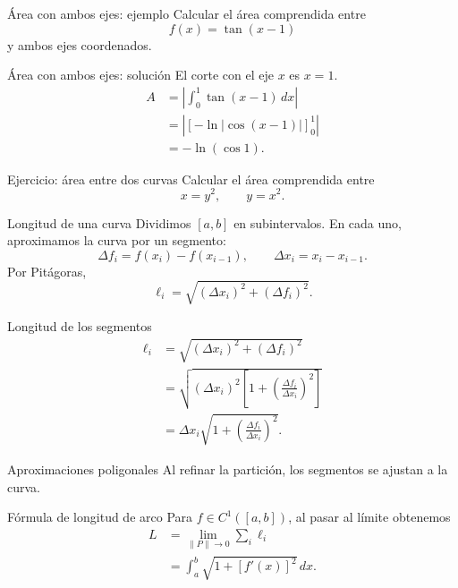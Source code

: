\documentclass[main.tex]{subfiles}
\begin{document}
\begin{frame}{Área con ambos ejes: ejemplo}
Calcular el área comprendida entre\[f(x)=\tan(x-1)\]y ambos ejes coordenados.
\end{frame}

\begin{frame}{Área con ambos ejes: solución}
El corte con el eje $x$ es $x=1$.\begin{align*}A&=\left|\int_0^1\tan(x-1)\,dx\right|\\&=\left|[-\ln|\cos(x-1)|]_0^1\right|\\&=\boxed{-\ln(\cos1)}.\end{align*}
\end{frame}

\begin{frame}{Ejercicio: área entre dos curvas}
Calcular el área comprendida entre\[x=y^2,\qquad y=x^2.\]
\end{frame}

\begin{frame}{Longitud de una curva}
\small Dividimos $[a,b]$ en subintervalos. En cada uno, aproximamos la curva por un segmento:\[\Delta f_i=f(x_i)-f(x_{i-1}),\qquad \Delta x_i=x_i-x_{i-1}.\]Por Pitágoras,\[\ell_i=\sqrt{(\Delta x_i)^2+(\Delta f_i)^2}.\]
\end{frame}

\begin{frame}{Longitud de los segmentos}
\begin{align*}\ell_i&=\sqrt{(\Delta x_i)^2+(\Delta f_i)^2}\\&=\sqrt{(\Delta x_i)^2\left[1+\left(\frac{\Delta f_i}{\Delta x_i}\right)^2\right]}\\&=\Delta x_i\sqrt{1+\left(\frac{\Delta f_i}{\Delta x_i}\right)^2}.\end{align*}
\end{frame}

\begin{frame}{Aproximaciones poligonales}
Al refinar la partición, los segmentos se ajustan a la curva.
\end{frame}

\begin{frame}{Fórmula de longitud de arco}
Para $f\in C^1([a,b])$, al pasar al límite obtenemos\begin{align*}L&=\lim_{\|P\|\to0}\sum_i\ell_i\\&=\boxed{\int_a^b\sqrt{1+[f\prime(x)]^2}\,dx.}\end{align*}
\end{frame}
\end{document}
